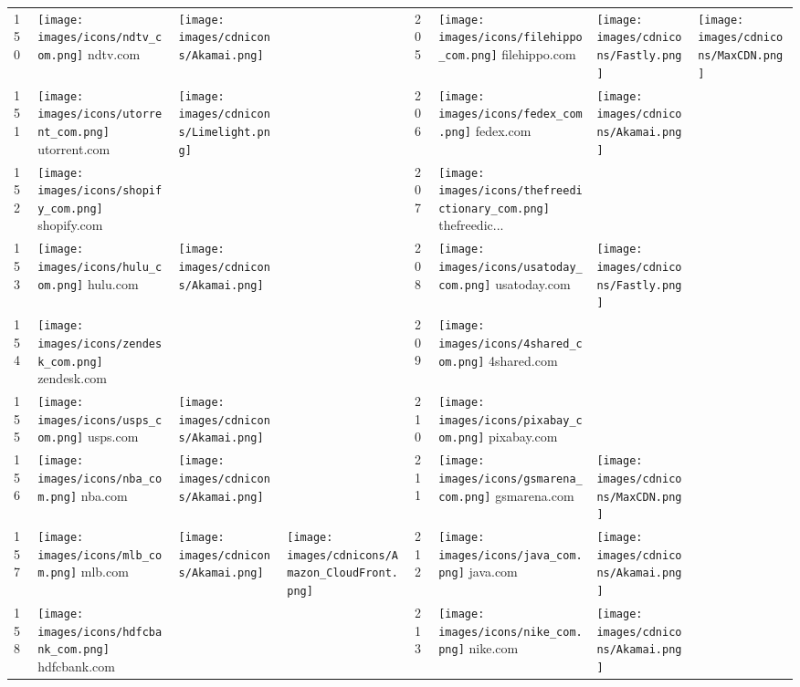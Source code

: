 \begin{table}[tbp]
\begin{tabular}{|llll|llll|}
150 & \texttt{[image: images/icons/ndtv\_com.png]} ndtv.com & \texttt{[image: images/cdnicons/Akamai.png]} & & 205 & \texttt{[image: images/icons/filehippo\_com.png]} filehippo.com & \texttt{[image: images/cdnicons/Fastly.png]} & \texttt{[image: images/cdnicons/MaxCDN.png]} \\
151 & \texttt{[image: images/icons/utorrent\_com.png]} utorrent.com & \texttt{[image: images/cdnicons/Limelight.png]} & & 206 & \texttt{[image: images/icons/fedex\_com.png]} fedex.com & \texttt{[image: images/cdnicons/Akamai.png]} & \\
152 & \texttt{[image: images/icons/shopify\_com.png]} shopify.com & & & 207 & \texttt{[image: images/icons/thefreedictionary\_com.png]} thefreedic... & & \\
153 & \texttt{[image: images/icons/hulu\_com.png]} hulu.com & \texttt{[image: images/cdnicons/Akamai.png]} & & 208 & \texttt{[image: images/icons/usatoday\_com.png]} usatoday.com & \texttt{[image: images/cdnicons/Fastly.png]} & \\
154 & \texttt{[image: images/icons/zendesk\_com.png]} zendesk.com & & & 209 & \texttt{[image: images/icons/4shared\_com.png]} 4shared.com & & \\
155 & \texttt{[image: images/icons/usps\_com.png]} usps.com & \texttt{[image: images/cdnicons/Akamai.png]} & & 210 & \texttt{[image: images/icons/pixabay\_com.png]} pixabay.com & & \\
156 & \texttt{[image: images/icons/nba\_com.png]} nba.com & \texttt{[image: images/cdnicons/Akamai.png]} & & 211 & \texttt{[image: images/icons/gsmarena\_com.png]} gsmarena.com & \texttt{[image: images/cdnicons/MaxCDN.png]} & \\
157 & \texttt{[image: images/icons/mlb\_com.png]} mlb.com & \texttt{[image: images/cdnicons/Akamai.png]} & \texttt{[image: images/cdnicons/Amazon\_CloudFront.png]} & 212 & \texttt{[image: images/icons/java\_com.png]} java.com & \texttt{[image: images/cdnicons/Akamai.png]} & \\
158 & \texttt{[image: images/icons/hdfcbank\_com.png]} hdfcbank.com & & & 213 & \texttt{[image: images/icons/nike\_com.png]} nike.com & \texttt{[image: images/cdnicons/Akamai.png]} & \\

\end{tabular}
\end{table}
